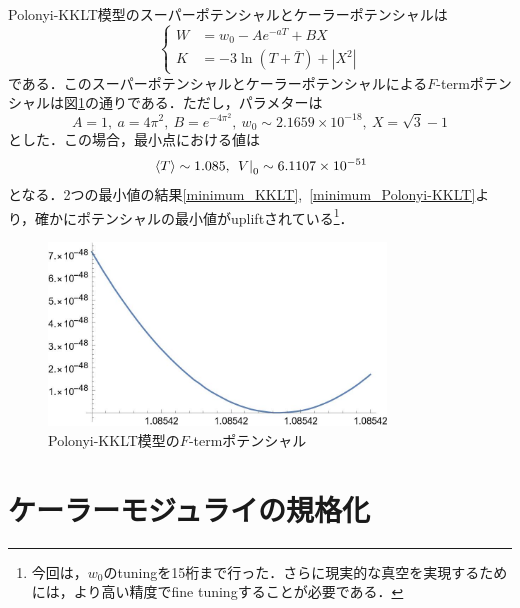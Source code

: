 \documentclass[a4paper,uplatex,dvipdfmx]{jsarticle}
\theoremstyle{definition}
\begin{document}
Polonyi-KKLT模型のスーパーポテンシャルとケーラーポテンシャルは
\begin{equation}
   \left\{
      \begin{alignedat}{1}
         W
         &=
         w_{0}
         -
         Ae^{-aT}
         +
         BX
         \\
         K
         &=
         -
         3\ln(T+\bar{T})
         +
         |X^2|
      \end{alignedat}
   \right.
   \nonumber
\end{equation}
である．このスーパーポテンシャルとケーラーポテンシャルによる$F$-termポテンシャルは図\ref{plot_Polonyi-KKLT_model}の通りである．ただし，パラメターは
\begin{equation}
   A=1
   ,\ 
   a=4 \pi^2
   ,\ 
   B=e^{-4\pi^2}
   ,\ 
   w_{0}
   \sim
   2.1659
   \times
   10^{-18}
   ,\ 
   X
   =
   \sqrt{3}-1
   \nonumber
\end{equation}
とした．この場合，最小点における値は
\begin{equation}
   \ev*{T}
   \sim
   1.085
   ,\ 
   \left.V\right|_{0}
   \sim
   6.1107\times 10^{-51}
   \label{minimum_Polonyi-KKLT}
\end{equation}
となる．2つの最小値の結果\eqref{minimum_KKLT},\ \eqref{minimum_Polonyi-KKLT}より，確かにポテンシャルの最小値がupliftされている\footnote{
   今回は，$w_{0}$のtuningを15桁まで行った．さらに現実的な真空を実現するためには，より高い精度でfine tuningすることが必要である．
}．

\begin{figure}[ht]
   \centering
   \includegraphics[width=0.8\textwidth]{fig/polonyi_kklt_minimum.jpg}
   \caption{Polonyi-KKLT模型の$F$-termポテンシャル}
   \label{plot_Polonyi-KKLT_model}
\end{figure}


\section{ケーラーモジュライの規格化}
\label{kahler_moduli_normalize}
\end{document}
